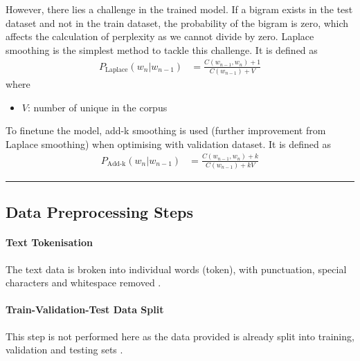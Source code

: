 However, there lies a challenge in the trained model. 
If a bigram exists in the test dataset and not in the train dataset, the probability of the bigram is zero, which affects the calculation of perplexity as we cannot divide by zero.
Laplace smoothing is the simplest method to tackle this challenge.
It is defined as 
\begin{align}
    P_{\text{Laplace}}(w_n | w_{n-1}) &=\frac{C(w_{n-1}, w_n) + 1}{C(w_{n-1}) + V}
\end{align}
where
\begin{itemize}
    \item $V$: number of unique in the corpus
\end{itemize}

To finetune the model, add-k smoothing is used (further improvement from Laplace smoothing) when optimising with validation dataset. 
It is defined as 
\begin{align}
    P_{\text{Add-k}}(w_n | w_{n-1}) &=\frac{C(w_{n-1}, w_n) + k}{C(w_{n-1}) + kV}
    \label{eq:additive_smoothing}
\end{align}

\hrule




\subsection*{Data Preprocessing Steps}

\paragraph{Text Tokenisation}
The text data is broken into individual words (token), with punctuation, special characters and whitespace removed \cite{web:pre-processing}.

\paragraph{Train-Validation-Test Data Split}
This step is not performed here as the data provided is already split into training, validation and testing sets \cite{web:pre-processing}.




